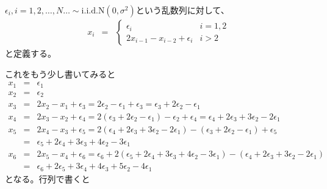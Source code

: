 \documentclass{jsarticle}
\newcommand{\normal}{\mathrm{N}}
\newcommand{\ampeq}{&=&}
\newcommand{\iid}{\mathrm{i.i.d.}}
\begin{document}
$\epsilon_i, i = 1, 2, \ldots, N \ldots \sim \iid \normal (0, \sigma^2)$という乱数列に対して、
\begin{eqnarray*}
 x_i \ampeq \left\{
             \begin{array}{cc}
              \epsilon_i & i = 1, 2 \\              
              2x_{i-1} - x_{i-2} + \epsilon_i& i > 2 
             \end{array}
            \right.
\end{eqnarray*}
と定義する。

これをもう少し書いてみると
\begin{eqnarray*}
 x_1 \ampeq \epsilon_1 \\
 x_2 \ampeq \epsilon_2 \\
 x_3 \ampeq 2x_2 - x_1 + \epsilon_3 = 2\epsilon_2 - \epsilon_1 + \epsilon_3
  = \epsilon_3 + 2\epsilon_2 - \epsilon_1 \\
 x_4 \ampeq 2x_3 - x_2 + \epsilon_4 = 2(\epsilon_3 + 2\epsilon_2 - \epsilon_1) - \epsilon_2 + \epsilon_4
  = \epsilon_4 + 2\epsilon_3 + 3\epsilon_2 - 2\epsilon_1 \\
 x_5 \ampeq 2x_4 - x_3 + \epsilon_5 = 
  2(\epsilon_4 + 2\epsilon_3 + 3\epsilon_2 - 2\epsilon_1) - 
  (\epsilon_3 + 2\epsilon_2 - \epsilon_1) +
  \epsilon_5 \\
 \ampeq
  \epsilon_5 + 2\epsilon_4 + 3\epsilon_3 + 4\epsilon_2 -3\epsilon_1 \\
 x_6 \ampeq 2x_5 - x_4 + \epsilon_6 = \epsilon_6 + 
  2(\epsilon_5 + 2\epsilon_4 + 3\epsilon_3 + 4\epsilon_2 -3\epsilon_1) - 
  (\epsilon_4 + 2\epsilon_3 + 3\epsilon_2 - 2\epsilon_1) \\
 \ampeq 
  \epsilon_6 + 2\epsilon_5 + 3\epsilon_4 + 4\epsilon_3 + 5\epsilon_2 - 4\epsilon_1
\end{eqnarray*}
となる。行列で書くと
\end{document}
